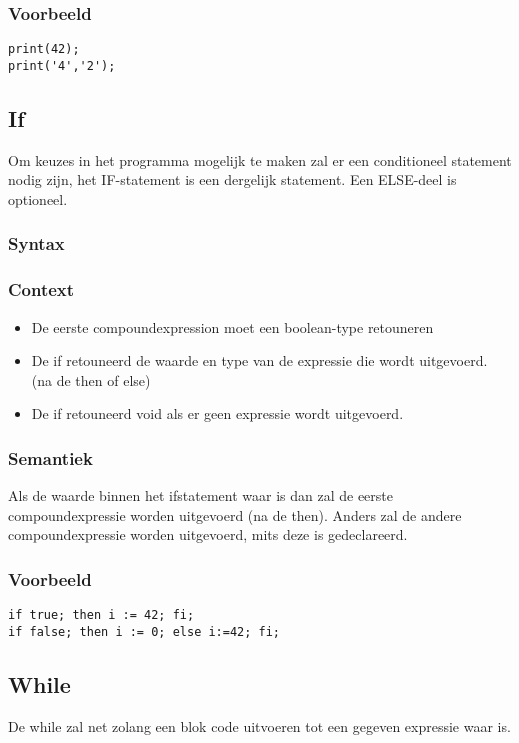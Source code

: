 \documentclass[]{article}
\begin{document}
\subsubsection{Voorbeeld}
\begin{lstlisting}[style=SELMA]
print(42);
print('4','2');
\end{lstlisting}

\subsection{If}
Om keuzes in het programma mogelijk te maken zal er een conditioneel statement nodig zijn, het IF-statement is een dergelijk statement. Een ELSE-deel is optioneel.
\subsubsection{Syntax}

\subsubsection{Context}
\begin{itemize}
\item De eerste compoundexpression moet een boolean-type retouneren
\item De if retouneerd de waarde en type van de expressie die wordt uitgevoerd. (na de then of else)
\item De if retouneerd void als er geen expressie wordt uitgevoerd.
\end{itemize}
\subsubsection{Semantiek}
Als de waarde binnen het ifstatement waar is dan zal de eerste compoundexpressie worden uitgevoerd (na de then). Anders zal de andere compoundexpressie worden uitgevoerd, mits deze is gedeclareerd.
\subsubsection{Voorbeeld}
\begin{lstlisting}[style=SELMA]
if true; then i := 42; fi;
if false; then i := 0; else i:=42; fi;
\end{lstlisting}

\subsection{While}
De while zal net zolang een blok code uitvoeren tot een gegeven expressie waar is.
\end{document}
